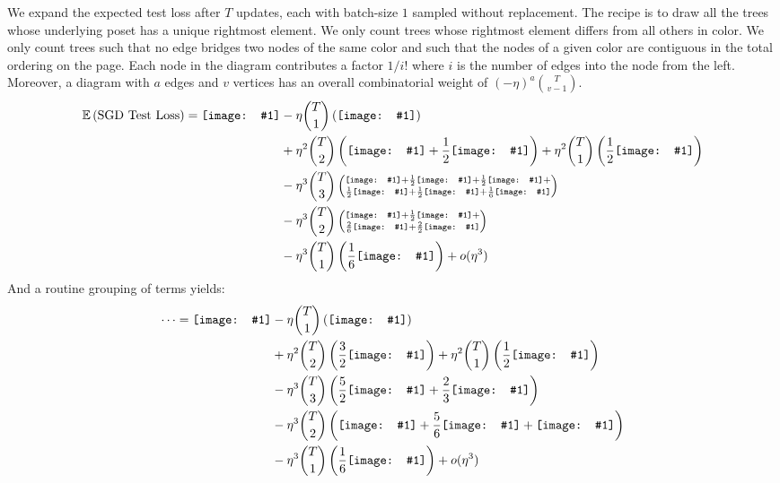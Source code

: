\documentclass[12pt]{article}
\newcommand{\half}{\frac{1}{2}}
\newcommand{\sixth}{\frac{1}{6}}
\newcommand{\twothird}{\frac{2}{3}}
\newcommand{\dia}[1]{\texttt{[image: \#1]}}
\begin{document}
            We expand the expected test loss after $T$ updates, each with batch-size $1$ sampled without
            replacement.  The recipe is to draw all the trees whose underlying poset has a unique rightmost element.
            We only count trees whose rightmost element differs from all others in color.  We only count trees
            such that no edge bridges two nodes of the same color and such that the nodes of a given color are
            contiguous in the total ordering on the page.
            Each node in the diagram contributes a factor $1/i!$ where $i$ is the number of edges into the node from
            the left.  Moreover, a diagram with $a$ edges and $v$ vertices has an overall combinatorial weight of
            $(-\eta)^a {T \choose v-1}$.
            \begin{align*}
                \expec \wrap{\text{SGD Test Loss}} = \dia{sgd-0}
                &- \eta   {T \choose 1} \wrap{\dia{sgd-1}} \\
                &+ \eta^2 {T \choose 2} \wrap{\dia{sgd-2a} + \half \dia{sgd-2b}}
                 + \eta^2 {T \choose 1} \wrap{\half \dia{new-rrg}} \\
                &- \eta^3 {T \choose 3} \wrap{\substack{
                        \dia{sgd-3a} + \half \dia{sgd-3b} + \half \dia{sgd-3c} + \\
                        \half \dia{sgd-3d} + \half \dia{sgd-3e} + \sixth \dia{sgd-3f}
                        }} \\  
                &- \eta^3 {T \choose 2} \wrap{\substack{
                        \dia{new-rggb} + \half \dia{new-rrgb-a} + \\
                        \frac{2}{6} \dia{new-rrgb-b} + \frac{2}{2} \dia{new-rrgb-c}
                        }} \\ 
                &- \eta^3 {T \choose 1} \wrap{\sixth \dia{new-rrrg}} 
                 + o(\eta^3)
            \end{align*}
            And a routine grouping of terms yields:
            \begin{align*}
                \cdots = \dia{sgd-0}
                &- \eta   {T \choose 1} \wrap{\dia{sgd-1}} \\
                &+ \eta^2 {T \choose 2} \wrap{\frac{3}{2}\dia{sgd-2a}}
                 + \eta^2 {T \choose 1} \wrap{\half \dia{new-rrg}} \\
                &- \eta^3 {T \choose 3} \wrap{\frac{5}{2} \dia{sgd-3a} + \twothird \dia{sgd-3b}} \\
                    &- \eta^3 {T \choose 2} \wrap{\dia{new-rggb} + \frac{5}{6} \dia{new-rrgb-a} + \dia{new-rrgb-c}} \\
                &- \eta^3 {T \choose 1} \wrap{\sixth \dia{new-rrrg}} 
                 + o(\eta^3)
            \end{align*}
\end{document}
